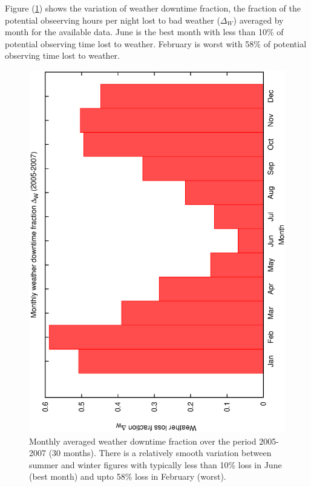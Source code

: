 {{Figure (\ref{fig:ecs_monthly_weather_stats}) shows the variation of weather downtime fraction, the fraction of the potential obseerving hours per night lost to bad weather ($\Delta_W$) averaged by month for the available data. June is the best month with less than 10\% of potential observing time lost to weather. February is worst with 58\% of potential observing time lost to weather.

\begin{figure}[htbp]
\begin{center}
    \includegraphics[scale=0.4, angle=-90]{figures/ecs/monthly_weather_stats.eps}
\end{center}   
\caption[Monthly averaged weather downtime fraction.]
{Monthly averaged weather downtime fraction over the period 2005-2007 (30 months). There is a relatively smooth variation between summer and winter figures with typically less than 10\% loss in June (best month) and upto 58\% loss in February (worst).}
 \label{fig:ecs_monthly_weather_stats}
\end{figure}


}}
